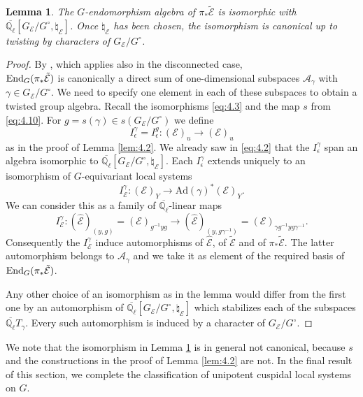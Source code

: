 \documentclass[11pt]{amsart}
\newtheorem{lem}[thm]{Lemma}
\theoremstyle{definition}
\newcommand{\Q}{\mathbb Q}
\def\End{{\rm End}}
\def\cE{{\mathcal E}}
\begin{document}
\begin{lem}\label{lem:4.3}
The $G$-endomorphism algebra of $\pi_* \tilde{\cE}$ is isomorphic with
$\overline{\Q_{\ell}}[G_\cE / G^\circ,\natural_\cE]$. Once $\natural_\cE$ has been chosen, 
the isomorphism is canonical up to twisting by characters of $G_\cE / G^\circ$.
\end{lem}
\begin{proof}
By \cite[Proposition 3.5]{Lus1}, which applies also in the disconnected case, \\
$\End_G (\pi_* \tilde{\cE})$ is canonically a direct sum of one-dimensional
subspaces $\mathcal A_\gamma$ with $\gamma \in G_\cE / G^\circ$. We need to
specify one element in each of these subspaces to obtain a twisted group algebra.
Recall the isomorphisms \eqref{eq:4.3} and the map $s$ from \eqref{eq:4.10}. 
For $g = s(\gamma) \in s (G_\cE / G^\circ)$ we define 
\[
I^\gamma_\epsilon = I^g_\epsilon : (\cE)_u \to (\cE )_u
\]
as in the proof of Lemma \ref{lem:4.2}. We already saw in \eqref{eq:4.2} that
the $I^\gamma_\epsilon$ span an algebra isomorphic to $\overline{\Q_{\ell}}[G_\cE / 
G^\circ,\natural_\cE]$. Each $I^\gamma_\epsilon$ extends uniquely to an 
isomorphism of $G$-equivariant local systems 
\begin{equation}\label{eq:4.17}
I^\gamma_\cE : (\cE )_Y \to \mathrm{Ad}(\gamma)^* (\cE )_Y. 
\end{equation}
We can consider this as a family of $\overline{\Q_{\ell}}$-linear maps 
\[
I^\gamma_\cE : (\hat \cE )_{(y,g)} = (\cE )_{g^{-1} y g} \to
(\hat \cE )_{(y,g \gamma^{-1})} = (\cE )_{\gamma g^{-1} y g \gamma^{-1}} .
\]
Consequently the $I^\gamma_\cE$ induce automorphisms of $\hat \cE$, of 
$\tilde \cE$ and of $\pi_* \tilde{\cE}$. The latter automorphism belongs to
$\mathcal A_\gamma$ and we take it as element of the
required basis of $\End_G (\pi_* \tilde{\cE})$.

Any other choice of an isomorphism as in the lemma would differ from the first
one by an automorphism of $\overline{\Q_{\ell}}[G_\cE / G^\circ,\natural_\cE]$
which stabilizes each of the subspaces $\overline{\Q_{\ell}} T_\gamma$. Every such
automorphism is induced by a character of $G_\cE / G^\circ$.
\end{proof}

We note that the isomorphism in Lemma \ref{lem:4.3} is in general not canonical,
because $s$ and the constructions in the proof of Lemma \ref{lem:4.2} are not. 
In the final result of this section, we complete the classification of unipotent
cuspidal local systems on $G$.
\end{document}
